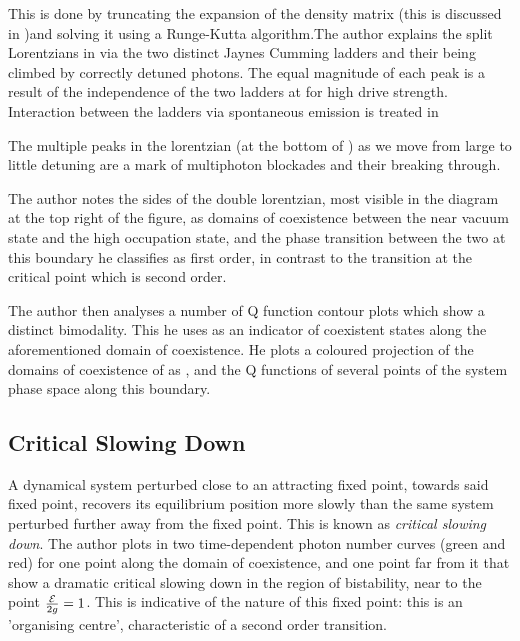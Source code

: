 This is done by truncating the expansion of the density matrix (this is discussed in \autocite{Savage1988})and solving it using a Runge-Kutta algorithm.The author explains the split Lorentzians in \autocite[Figure 1]{Carmichael2015} via the two distinct Jaynes Cumming ladders and their being climbed by correctly detuned photons. The equal magnitude of each peak is a result of the independence of the two ladders at for high drive strength. Interaction between the ladders via spontaneous emission is treated in \autocite[Section V]{Carmichael2015}

The multiple peaks in the lorentzian (at the bottom of \autocite[Figure 1]{Carmichael2015}) as we move from large to little detuning are a mark of multiphoton blockades and their breaking through.

The author notes the sides of the double lorentzian, most visible in the diagram at the top right of the figure, as domains of coexistence between the near vacuum state and the high occupation state, and the phase transition between the two at this boundary he classifies as first order, in contrast to the transition at the critical point which is second order.

The author then analyses a number of Q function contour plots which show a distinct bimodality. This he uses as an indicator of coexistent states along the aforementioned domain of coexistence. He plots a coloured projection of the domains of coexistence of \autocite[Figure 1 right hand side]{Carmichael2015} as \autocite[Figure 2]{Carmichael2015}, and the Q functions of several points of the system phase space along this boundary. 

\subsection{Critical Slowing Down}

A dynamical system perturbed close to an attracting fixed point, towards said fixed point, recovers its equilibrium position more slowly than the same system perturbed further away from the fixed point. This is known as \emph{critical slowing down}\autocite[40, 56]{Strogatz1994}. The author plots in \autocite[Figure 3]{Carmichael2015} two time-dependent photon number curves (green and red) for one point along the domain of coexistence, and one point far from it that show a dramatic critical slowing down in the region of bistability, near to the point $\frac{\mathcal{E}}{2g} = 1$. This is indicative of the nature of this fixed point: this is an 'organising centre', characteristic of a second order transition. 

